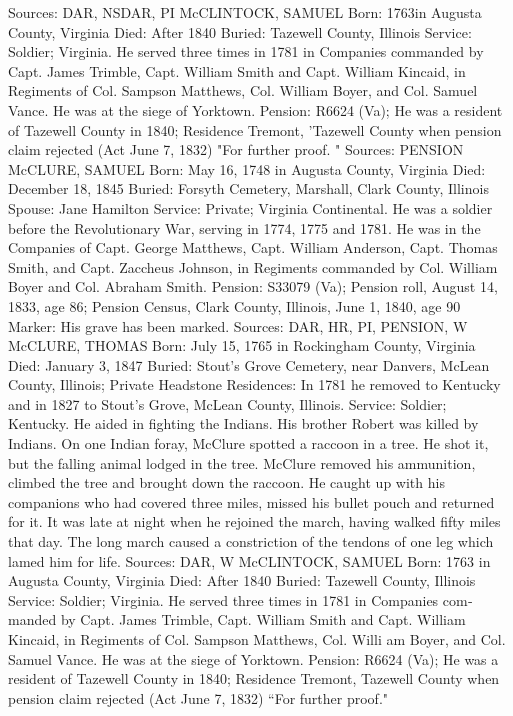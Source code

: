 Sources: DAR, NSDAR, PI 
McCLINTOCK, SAMUEL
Born: 1763in Augusta County, Virginia 
Died: After 1840 
Buried: Tazewell County, Illinois 
Service: Soldier; Virginia. He served three times in 1781 in Companies com­manded by Capt. James Trimble, Capt. William Smith and Capt. William Kincaid, in Regiments of Col. Sampson Matthews, Col. William Boyer, and Col. Samuel Vance. He was at the siege of Yorktown. 
Pension: R6624 (Va); He was a resident of Tazewell County in 1840; Residence Tremont, 'Tazewell County when pension claim rejected (Act June 7, 1832) "For further proof. " 
Sources: PENSION\V 
McCLURE, SAMUEL
Born: May 16, 1748 in Augusta County, Virginia
Died: December 18, 1845
Buried: Forsyth Cemetery, Marshall, Clark County, Illinois
Spouse: Jane Hamilton
Service: Private; Virginia Continental. He was a soldier before the Revolutionary War, serving in 1774, 1775 and 1781. He was in the Companies of Capt. George Matthews, Capt. William Anderson, Capt. Thomas Smith, and Capt. Zaccheus Johnson, in Regiments commanded by Col. William Boyer and Col. Abraham Smith. 
Pension: S33079 (Va); Pension roll, August 14, 1833, age 86; Pension Census, Clark County, Illinois, June 1, 1840, age 90
Marker: His grave has been marked.
Sources: DAR, HR, PI, PENSION, W 
McCLURE, THOMAS
Born: July 15, 1765 in Rockingham County, Virginia
Died: January 3, 1847
Buried: Stout's Grove Cemetery, near Danvers, McLean County, Illinois; Private 
Headstone
Residences: In 1781 he removed to Kentucky and in 1827 to Stout's Grove, McLean County, Illinois.
Service: Soldier; Kentucky. He aided in fighting the Indians. His brother Robert was killed by Indians. On one Indian foray, McClure spotted a raccoon in a tree. He shot it, but the falling animal lodged in the tree. McClure removed his ammunition, climbed the tree and brought down the raccoon. He caught up with his companions who had covered three miles, missed his bullet pouch and returned for it. It was late at night when he rejoined the march, having walked fifty miles that day. The long march caused a constriction of the tendons of one leg which lamed him for life. 
Sources: DAR, W 
McCLINTOCK, SAMUEL
Born: 1763 in Augusta County, Virginia 
Died: After 1840 
Buried: Tazewell County, Illinois 
Service: Soldier; Virginia. He served three times in 1781 in Companies com­manded by Capt. James Trimble, Capt. William Smith and Capt. William Kincaid, in Regiments of Col. Sampson Matthews, Col. Willi am Boyer, and Col. Samuel Vance. He was at the siege of Yorktown. 
Pension: R6624 (Va); He was a resident of Tazewell County in 1840; Residence Tremont, Tazewell County when pension claim rejected (Act June 7, 1832) “For further proof." 

